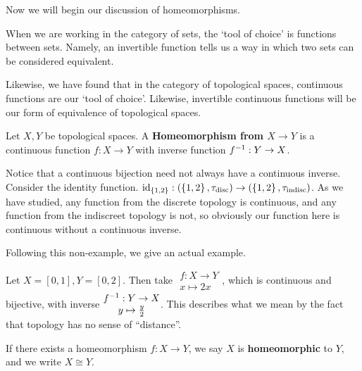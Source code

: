 \documentclass[12pt, twosided]{article}
\begin{document}
Now we will begin our discussion of homeomorphisms.

When we are working in the category of sets, the `tool of choice' is functions between sets. Namely, an invertible function tells us a way in which two sets can be considered equivalent.

Likewise, we have found that in the category of topological spaces, continuous functions are our `tool of choice'. Likewise, invertible continuous functions will be our form of equivalence of topological spaces.

\begin{df}
  Let \(X, Y\) be topological spaces. A \textbf{Homeomorphism from \(X \to Y\)} is a continuous function \(f: X \to Y\) with inverse function \(f^{-1}:Y \to X\).
\end{df}

\begin{exa}
  Notice that a continuous bijection need not always have a continuous inverse. Consider the identity function. \(\mathrm{id}_{\{1, 2\}}:(\left\{ 1, 2 \right\}, \tau_{\mathrm{disc}}) \to (\left\{ 1, 2 \right\}, \tau_{\mathrm{indisc}})\). As we have studied, any function from the discrete topology is continuous, and any function from the indiscreet topology is not, so obviously our function here is continuous without a continuous inverse.
\end{exa}

Following this non-example, we give an actual example.

\begin{exa}
  Let \(X = [0, 1], Y = [0, 2]\). Then take \(
  \begin{matrix}
    f: X \to Y \\ x \mapsto 2x 
  \end{matrix} \), which is continuous and bijective, with inverse \(
  \begin{matrix}
    f^{-1}: Y \to X \\ y \mapsto \frac{y}{2}
  \end{matrix}\). This describes what we mean by the fact that topology has no sense of ``distance''.
\end{exa}

\begin{df}
  If there exists a homeomorphism \(f: X \to Y\), we say \(X\) is \textbf{homeomorphic} to \(Y\), and we write \(X \cong Y\).
\end{df}
\end{document}
